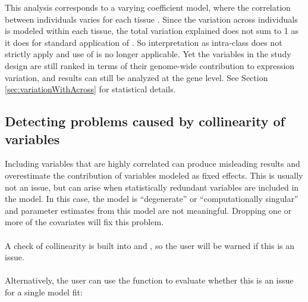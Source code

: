 \documentclass[12pt]{article}\usepackage[]{graphicx}\usepackage[]{xcolor}
\begin{document}
This analysis corresponds to a varying coefficient model, where the correlation between individuals varies for each tissue \cite{Pinheiro2000}.  Since the variation across individuals is modeled within each tissue, the total variation explained does not sum to 1 as it does for standard application of .  So interpretation as intra-class does not strictly apply and use of  is no longer applicable.  Yet the variables in the study design are still ranked in terms of their genome-wide contribution to expression variation, and results can still be analyzed at the gene level.  See Section \ref{sec:variationWithAcross} for statistical details.


\subsection{Detecting problems caused by collinearity of variables}
\label{sec:collinearity}
Including variables that are highly correlated can produce misleading results and overestimate the contribution of variables modeled as fixed effects.  This is usually not an issue, but can arise when statistically redundant variables are included in the model.   In this case, the model is ``degenerate'' or ``computationally singular'' and parameter estimates from this model are not meaningful.  Dropping one or more of the covariates will fix this problem.\\
\\
A check of collinearity is built into  and , so the user will be warned if this is an issue.\\
\\
Alternatively, the user can use the  function to evaluate whether this is an issue for a single model fit:  
\end{document}
